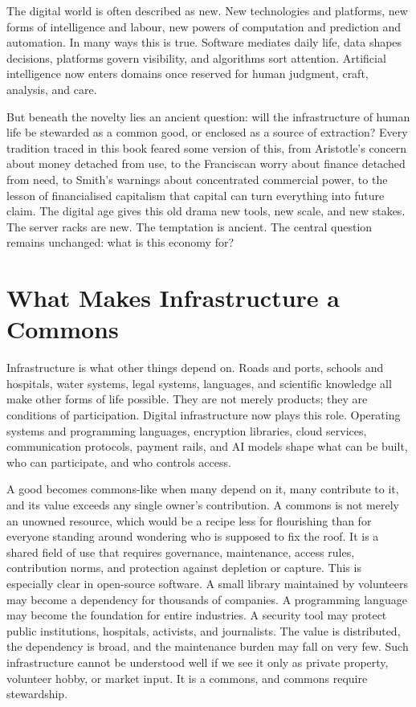 \documentclass[11pt,a4paper,oneside]{book}
\begin{document}
The digital world is often described as new. New technologies and platforms, new forms of intelligence and labour, new powers of computation and prediction and automation. In many ways this is true. Software mediates daily life, data shapes decisions, platforms govern visibility, and algorithms sort attention. Artificial intelligence now enters domains once reserved for human judgment, craft, analysis, and care.

But beneath the novelty lies an ancient question: will the infrastructure of human life be stewarded as a common good, or enclosed as a source of extraction? Every tradition traced in this book feared some version of this, from Aristotle's concern about money detached from use, to the Franciscan worry about finance detached from need, to Smith's warnings about concentrated commercial power, to the lesson of financialised capitalism that capital can turn everything into future claim. The digital age gives this old drama new tools, new scale, and new stakes. The server racks are new. The temptation is ancient. The central question remains unchanged: what is this economy for?

\section*{What Makes Infrastructure a Commons}

Infrastructure is what other things depend on. Roads and ports, schools and hospitals, water systems, legal systems, languages, and scientific knowledge all make other forms of life possible. They are not merely products; they are conditions of participation. Digital infrastructure now plays this role. Operating systems and programming languages, encryption libraries, cloud services, communication protocols, payment rails, and AI models shape what can be built, who can participate, and who controls access.

A good becomes commons-like when many depend on it, many contribute to it, and its value exceeds any single owner's contribution. A commons is not merely an unowned resource, which would be a recipe less for flourishing than for everyone standing around wondering who is supposed to fix the roof. It is a shared field of use that requires governance, maintenance, access rules, contribution norms, and protection against depletion or capture. This is especially clear in open-source software. A small library maintained by volunteers may become a dependency for thousands of companies. A programming language may become the foundation for entire industries. A security tool may protect public institutions, hospitals, activists, and journalists. The value is distributed, the dependency is broad, and the maintenance burden may fall on very few. Such infrastructure cannot be understood well if we see it only as private property, volunteer hobby, or market input. It is a commons, and commons require stewardship.
\end{document}
